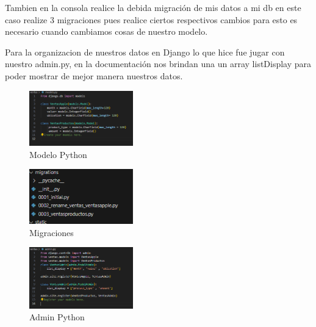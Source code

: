 \documentclass[conference]{IEEEtran}
\begin{document}
Tambien en la consola realice la debida migración de mis datos a mi db en este caso realize 3 migraciones pues realice ciertos respectivos cambios para esto es necesario cuando cambiamos cosas de nuestro modelo.

Para la organizacion de nuestros datos en Django lo que hice fue jugar con nuestro admin.py, en la documentación nos brindan una un array listDisplay para poder mostrar de mejor manera nuestros datos.



\begin{figure}[h] %
    \centering
    \includegraphics[width=0.4\textwidth]{images/Models.png} %
    \caption{Modelo Python}
    \label{fig:mi_imagen}
\end{figure}

\begin{figure}[h] %
    \centering
    \includegraphics[width=0.4\textwidth]{images/Migrations.png} %
    \caption{Migraciones}
    \label{fig:mi_imagen}
\end{figure}
\begin{figure}[h] %
    \centering
    \includegraphics[width=0.4\textwidth]{images/adminpy.png} %
    \caption{Admin Python}
    \label{fig:mi_imagen}
\end{figure}
\end{document}
